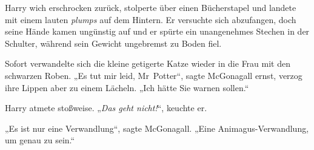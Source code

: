 Harry wich erschrocken zurück, stolperte über einen Bücherstapel und landete mit einem lauten \emph{plumps} auf dem Hintern. Er versuchte sich abzufangen, doch seine Hände kamen ungünstig auf und er spürte ein unangenehmes Stechen in der Schulter, während sein Gewicht ungebremst zu Boden fiel.

Sofort verwandelte sich die kleine getigerte Katze wieder in die Frau mit den schwarzen Roben.
„Es tut mir leid, Mr~Potter“, sagte McGonagall ernst, verzog ihre Lippen aber zu einem Lächeln.
„Ich hätte Sie warnen sollen.“

Harry atmete stoßweise.
„\emph{Das geht nicht!}“, keuchte er.

„Es ist nur eine Verwandlung“, sagte McGonagall.
„Eine Animagus-Verwandlung, um genau zu sein.“

